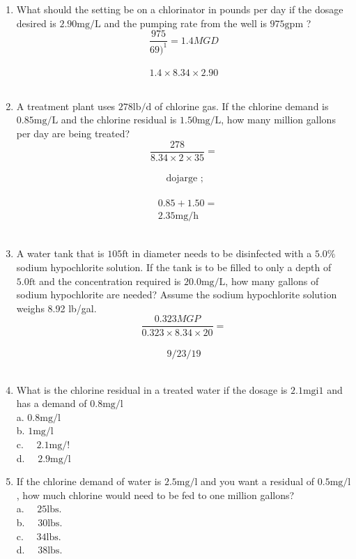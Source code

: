 \documentclass{article}
\begin{document}
\begin{enumerate}
\item What should the setting be on a chlorinator in pounds per day if the dosage desired is $2.90 \mathrm{mg} / \mathrm{L}$ and the pumping rate from the well is $975 \mathrm{gpm}$ ?\\
$$\frac{975}{69)^{1}}=1.4 MGD $$\\
$$1.4 \times 8.34 \times 2.90$$\\

\item A treatment plant uses $278 \mathrm{lb} / \mathrm{d}$ of chlorine gas. If the chlorine demand is $0.85 \mathrm{mg} / \mathrm{L}$ and the chlorine residual is $1.50 \mathrm{mg} / \mathrm{L}$, how many million gallons per day are being treated?\\
$$\frac{278}{8.34 \times 2 \times 35}=$$\\
$$\text { dojarge } ;$$\\
$$\begin{aligned}& 0.85+1.50= \\& 2.35 \mathrm{mg} / \mathrm{h}\end{aligned}$$\\

\item A water tank that is $105 \mathrm{ft}$ in diameter needs to be disinfected with a $5.0 \%$ sodium hypochlorite solution. If the tank is to be filled to only a depth of $5.0 \mathrm{ft}$ and the concentration required is $20.0 \mathrm{mg} / \mathrm{L}$, how many gallons of sodium hypochlorite are needed? Assume the sodium hypochlorite solution weighs 8.92 lb/gal.\\
$$\frac{0.323 M G P}{0.323 \times 8.34 \times 20}=$$\\
$$9 / 23 / 19$$\\

\item What is the chlorine residual in a treated water if the dosage is $2.1 \mathrm{mgi1}$ and has a demand of $0.8 \mathrm{mg} / \mathrm{l}$\\
a. $0.8 \mathrm{mg} / \mathrm{l}$\\
b. $1 \mathrm{mg} / \mathrm{l}$\\
c. $\quad 2.1 \mathrm{mg} / !$\\
d. $\quad 2.9 \mathrm{mg} / \mathrm{l}$\\

\item If the chlorine demand of water is $2.5 \mathrm{mg} / \mathrm{l}$ and you want a residual of $0.5 \mathrm{mg} / \mathrm{l}$, how much chlorine would need to be fed to one million gallons?\\
a. $\quad 25 \mathrm{lbs}$.\\
b. $\quad 30 \mathrm{lbs}$.\\
c. $\quad 34 \mathrm{lbs}$.\\
d. $\quad 38 \mathrm{lbs}$.\\


\end{enumerate}
\end{document}
